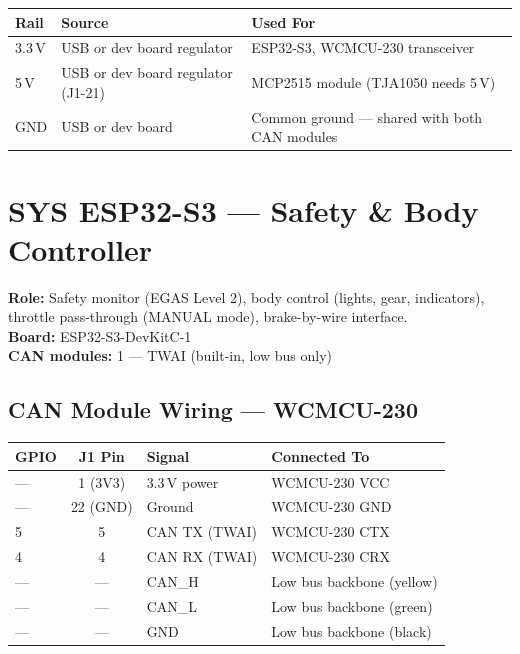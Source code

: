 \documentclass[12pt,a4paper,oneside]{report}
\begin{document}
\begin{center}
\begin{tabular}{lll}
\toprule
\textbf{Rail} & \textbf{Source} & \textbf{Used For} \\
\midrule
3.3\,V & USB or dev board regulator & ESP32-S3, WCMCU-230 transceiver \\
5\,V   & USB or dev board regulator (J1-21) & MCP2515 module (TJA1050 needs 5\,V) \\
GND    & USB or dev board & Common ground --- shared with both CAN modules \\
\bottomrule
\end{tabular}
\end{center}


\chapter{SYS ESP32-S3 --- Safety \& Body Controller}

\textbf{Role:} Safety monitor (EGAS Level 2), body control (lights, gear, indicators), throttle pass-through (MANUAL mode), brake-by-wire interface.\\
\textbf{Board:} ESP32-S3-DevKitC-1\\
\textbf{CAN modules:} 1 --- TWAI (built-in, low bus only)

\section{CAN Module Wiring --- WCMCU-230}

\begin{center}
\begin{tabular}{lcll}
\toprule
\textbf{GPIO} & \textbf{J1 Pin} & \textbf{Signal} & \textbf{Connected To} \\
\midrule
--- & 1 (3V3)  & 3.3\,V power & WCMCU-230 VCC \\
--- & 22 (GND) & Ground       & WCMCU-230 GND \\
5   & 5        & CAN TX (TWAI) & WCMCU-230 CTX \\
4   & 4        & CAN RX (TWAI) & WCMCU-230 CRX \\
--- & ---      & CAN\_H       & Low bus backbone (yellow) \\
--- & ---      & CAN\_L       & Low bus backbone (green) \\
--- & ---      & GND          & Low bus backbone (black) \\
\bottomrule
\end{tabular}
\end{center}
\end{document}
